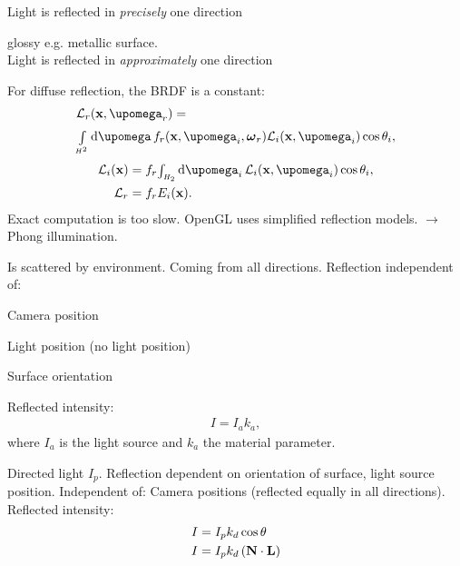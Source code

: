 \begin{compactdesc}
\begin{enumerate*}[label=\protect\circled{\arabic*},itemjoin=]
			Light is reflected in \emph{precisely} one direction\\
		\item glossy e.g. metallic surface.\\
			Light is reflected in \emph{approximately} one direction\\
	\end{enumerate*}
	For diffuse reflection, the BRDF is a constant:
	\begin{align*}
		&\mathcal{L}_r\!\left( \vtr{x},\vtr{\upomega}_r \right)=\\
		& {\scriptstyle\int\limits_{H^2}^{}}\dd{\vtr{\upomega}}\, f_r(\vtr{x},\vtr{\upomega}_i,\vtr{\omega}_r)\mathcal{L}_i(\vtr{x},\vtr{\upomega}_i)\cos\theta_i,
	\end{align*}
	\begin{align*}
		\mathcal{L}_i(\vtr{x})&=f_r{\scriptstyle\int_{H_2}^{}}\dd{\vtr{\upomega}_i}\, \mathcal{L}_i(\vtr{x},\vtr{\upomega}_i)\cos\theta_i,\\
		\mathcal{L}_r&=f_rE_i(\vtr{x}).
	\end{align*}
	Exact computation is too slow. OpenGL uses simplified reflection models. $\to$ Phong illumination.
\item[\lp{Ambient Light}] Is scattered by environment. Coming from all directions. Reflection independent of:\\
	\begin{enumerate*}[label=\protect\circled{\arabic*},itemjoin=]
		\item Camera position\\
		\item Light position (no light position)\\
		\item Surface orientation\\
	\end{enumerate*}
	Reflected intensity:
	\begin{gather*}
		I=I_ak_a,
	\end{gather*}
	where $I_a$ is the light source and $k_a$ the material parameter.
\item[\lp{diffuse reflection}] Directed light $I_p$. Reflection dependent on orientation of surface, light source position. Independent of: Camera positions (reflected equally in all directions). Reflected intensity:
	\begin{align*}
		I&=I_pk_d\cos\theta\\
		I&=I_pk_d\left( \bm{\mathrm{N}}\cdot \bm{\mathrm{L}} \right)
	\end{align*}

\end{compactdesc}
